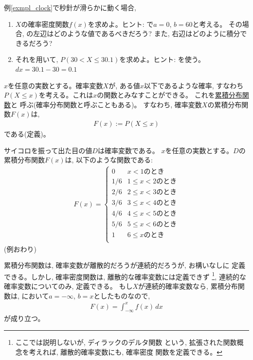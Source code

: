 \begin{q}\label{q:stat_clock_sec_densityF} 例\ref{exmpl_clock}で秒針が滑らかに動く場合, 
\begin{enumerate}
\item $X$の確率密度関数$f(x)$を求めよ。ヒント: で$a=0$, $b=60$と考える。
その場合, の左辺はどのような値であるべきだろう? また, 右辺はどのように積分できるだろう?
\item それを用いて, $P(30<X\le30.1)$を求めよ。ヒント: を使う。$dx=30.1-30=0.1$
\end{enumerate}
\end{q}
\mv

$x$を任意の実数とする。確率変数$X$が, ある値$x$以下であるような確率, 
すなわち$P(X\leq x)$を考える。これは$x$の関数とみなすことができる。
これを\underline{累積分布関数}と
呼ぶ(確率分布関数と呼ぶこともある)。
すなわち, 確率変数$X$の累積分布関数$F(x)$は, 
\begin{eqnarray}F(x):=P(X\leq x)\label{eq:probdist_define}\end{eqnarray}
である(定義)。

\begin{exmpl} サイコロを振って出た目の値$D$は確率変数である。
$x$を任意の実数とする。$D$の累積分布関数$F(x)$は, 以下のような関数である:
\begin{eqnarray}
F(x)=\begin{cases}
0 & x<1\text{のとき}\\
1/6 & 1\leq x<2\text{のとき}\\
2/6 & 2\leq x<3\text{のとき}\\
3/6 & 3\leq x<4\text{のとき}\\
4/6 & 4\leq x<5\text{のとき}\\
5/6 & 5\leq x<6\text{のとき}\\
1 & 6\leq x\text{のとき}\\
\end{cases}
\end{eqnarray}
(例おわり)\end{exmpl}

累積分布関数は, 確率変数が離散的だろうが連続的だろうが, お構いなしに
定義できる。しかし, 確率密度関数は, 離散的な確率変数には定義できず
\footnote{ここでは説明しないが, ディラックのデルタ関数
という, 拡張された関数概念を考えれば, 離散的確率変数にも, 確率密度
関数を定義できる。}, 連続的な確率変数についてのみ, 定義できる。
もし$X$が連続的確率変数なら, 累積分布関数は, 
において$a=-\infty$, $b=x$としたものなので,
\begin{eqnarray}
F(x)=\int_{-\infty}^{x}f(x)\,dx
\label{eq:probdist_infty}\end{eqnarray}
が成り立つ。
\mv


